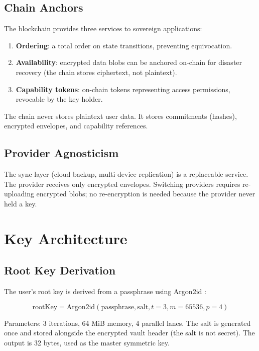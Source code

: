 \documentclass[11pt,a4paper]{article}
\begin{document}
\subsection{Chain Anchors}

The blockchain provides three services to sovereign applications:
\begin{enumerate}[nosep]
  \item \textbf{Ordering}: a total order on state transitions, preventing
        equivocation.
  \item \textbf{Availability}: encrypted data blobs can be anchored on-chain
        for disaster recovery (the chain stores ciphertext, not plaintext).
  \item \textbf{Capability tokens}: on-chain tokens representing access
        permissions, revocable by the key holder.
\end{enumerate}

The chain never stores plaintext user data.  It stores commitments
(hashes), encrypted envelopes, and capability references.

\subsection{Provider Agnosticism}

The sync layer (cloud backup, multi-device replication) is a replaceable
service.  The provider receives only encrypted envelopes.  Switching
providers requires re-uploading encrypted blobs; no re-encryption is needed
because the provider never held a key.

\section{Key Architecture}
\label{sec:keys}

\subsection{Root Key Derivation}

The user's root key is derived from a passphrase using Argon2id
\cite{argon2}:

\begin{equation}
  \text{rootKey} = \text{Argon2id}(\text{passphrase}, \text{salt}, t=3, m=65536, p=4)
\end{equation}

Parameters: 3 iterations, 64 MiB memory, 4 parallel lanes.  The salt is
generated once and stored alongside the encrypted vault header (the salt
is not secret).  The output is 32 bytes, used as the master symmetric key.
\end{document}
